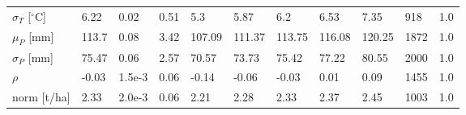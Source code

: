 \documentclass[12pt]{iopart}
\begin{document}
\begin{table}
\begin{tabular}{lllllllllll}
$\sigma_T$ [$^\circ$C]  & 6.22    &  0.02     &  0.51   &   5.3   &   5.87  &    6.2  &  6.53   &  7.35   &   918   &    1.0\\
$\mu_P$ [mm]            & 113.7   &   0.08    &   3.42  & 107.09  & 111.37  & 113.75  & 116.08  &  120.25 &  1872   &    1.0\\
$\sigma_P$ [mm]         & 75.47   &   0.06    &  2.57   &  70.57  &  73.73  &  75.42  &  77.22  &  80.55  &  2000   &    1.0\\
$\rho$                  & -0.03   &  1.5e-3   &  0.06   &  -0.14  &  -0.06  &  -0.03  &   0.01  &   0.09  &   1455  &    1.0\\
norm  [t/ha]            & 2.33    &  2.0e-3   &   0.06  &   2.21  &   2.28  &   2.33  &   2.37  &   2.45  &   1003  &    1.0\\
\end{tabular}
\end{table}
\end{document}
